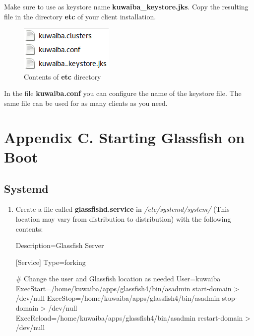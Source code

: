 \documentclass[a4paper]{article}
\begin{document}
\begin{appendices}
\begin{enumerate}
					Make sure to use as keystore name \textbf{kuwaiba\_keystore.jks}. Copy the resulting file in the directory \textbf{etc} of your client installation.\\
					
					\begin{figure}[h!]
						\centering
						\includegraphics[width=0.2\linewidth]{img/etc_contents.png} 	
						\caption{Contents of \textbf{etc} directory}
						\label{fig:etc-contents}
					\end{figure}
					In the file \textbf{kuwaiba.conf} you can configure the name of the keystore file. The same file can be used for as many clients as you need.
				\end{enumerate}
			\section{Appendix C. Starting Glassfish on Boot} \label{app:AppendixC}
				\subsection{Systemd}
				\begin{enumerate}
					\item Create a file called \textbf{glassfishd.service} in \textit{/etc/systemd/system/} (This location may vary from distribution to distribution) with the following contents:
					\begin{verbbox}
						[Unit]
						Description=Glassfish Server
						
						[Service]
						Type=forking
						
						# Change the user and Glassfish location as needed
						User=kuwaiba
						ExecStart=/home/kuwaiba/apps/glassfish4/bin/asadmin start-domain > /dev/null
						ExecStop=/home/kuwaiba/apps/glassfish4/bin/asadmin stop-domain > /dev/null
						ExecReload=/home/kuwaiba/apps/glassfish4/bin/asadmin restart-domain > /dev/null
						

\end{verbbox}
\end{enumerate}
\end{appendices}
\end{document}
